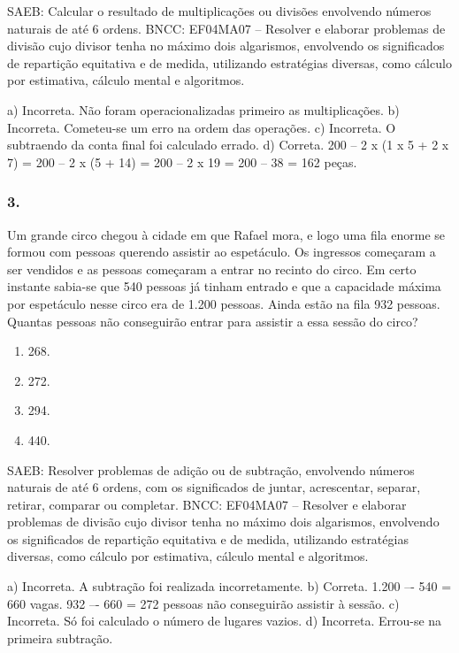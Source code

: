 \begin{enumerate}
\begin{escolha}
SAEB: Calcular o resultado de multiplicações ou divisões envolvendo números naturais de até 6 ordens.
BNCC: EF04MA07 -- Resolver e elaborar problemas de divisão cujo divisor tenha no máximo dois algarismos,
envolvendo os significados de repartição equitativa e de medida, utilizando estratégias diversas,
como cálculo por estimativa, cálculo mental e algoritmos.

a) Incorreta. Não foram operacionalizadas primeiro as multiplicações.
b) Incorreta. Cometeu-se um erro na ordem das operações.
c) Incorreta. O subtraendo da conta final foi calculado errado.
d) Correta. 200 -- 2 x (1 x 5 + 2 x 7) = 200 -- 2 x (5 + 14) = 200 -- 2 x 19 = 200 -- 38 = 162 peças.

\subsubsection{3.}\label{section-25}

Um grande circo chegou à cidade em que Rafael mora, e logo uma fila
enorme se formou com pessoas querendo assistir ao espetáculo. Os
ingressos começaram a ser vendidos e as pessoas começaram a entrar no
recinto do circo. Em certo instante sabia-se que 540 pessoas já tinham
entrado e que a capacidade máxima por espetáculo nesse circo era de 1.200 pessoas. Ainda estão na fila 932 pessoas. Quantas pessoas não
conseguirão entrar para assistir a essa sessão do circo?

\begin{enumerate}
\def\labelenumi{\alph{enumi})}
\item
  268.
\item
  272.
\item
  294.
\item
  440.
\end{enumerate}

SAEB: Resolver problemas de adição ou de subtração, envolvendo números naturais de até 6 ordens, com os significados de juntar, acrescentar, separar, retirar, comparar ou completar.
BNCC: EF04MA07 -- Resolver e elaborar problemas de divisão cujo divisor tenha no máximo dois algarismos,
envolvendo os significados de repartição equitativa e de medida, utilizando estratégias diversas,
como cálculo por estimativa, cálculo mental e algoritmos.

a) Incorreta. A subtração foi realizada incorretamente.
b) Correta. 1.200 –- 540 = 660 vagas. 932 –- 660 = 272 pessoas não conseguirão assistir à sessão.
c) Incorreta. Só foi calculado o número de lugares vazios.
d) Incorreta. Errou-se na primeira subtração.



\end{escolha}
\end{enumerate}
